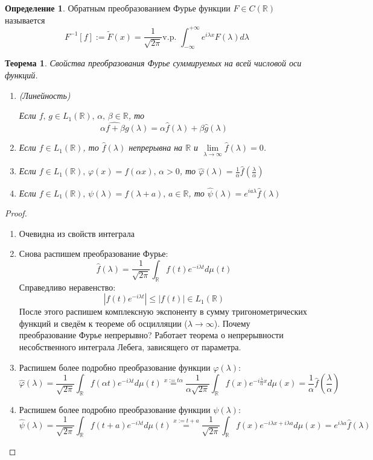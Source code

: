 \documentclass[a4paper,12pt]{article}
\renewcommand{\phi}{\ensuremath{\varphi}}
\renewcommand{\leq}{\ensuremath{\leqslant}}
\theoremstyle{plain}
\newtheorem{theorem}{Теорема}[section]
\theoremstyle{definition}
\newtheorem{definition}{Определение}[section]
\theoremstyle{remark}
\begin{document}
\begin{definition}
	Обратным преобразованием Фурье функции $F \in C(\mathbb{R})$ называется
	\[F^{-1}[f] := \tilde{F}(x) = \frac{1}{\sqrt{2\pi}} \text{v.p. }\int_{-\infty}^{+\infty}e^{i\lambda x}F(\lambda)d\lambda\]
\end{definition}

\begin{theorem}
	Свойства преобразования Фурье суммируемых на всей числовой оси функций.

	\begin{enumerate}
		\item (Линейность)

		      Если $f,\,g \in L_1(\mathbb{R}),\, \alpha,\, \beta \in \mathbb{R}$, то
		      \[\widehat{\alpha f + \beta g}(\lambda) = \alpha\hat{f}(\lambda) + \beta\hat{g}(\lambda)\]
		\item Если $f \in L_1(\mathbb{R})$, то $\hat{f}(\lambda)$ непрерывна на $\mathbb{R}$ и $\lim\limits_{\lambda \to \infty}\hat{f}(\lambda) = 0$.
		\item Если $f \in L_1(\mathbb{R}),\, \phi(x) = f(\alpha x),\, \alpha > 0$, то $\hat{\phi}(\lambda) = \frac{1}{\alpha}\hat{f}(\frac{\lambda}{\alpha})$
		\item Если $f \in L_1(\mathbb{R}),\, \psi(\lambda) = f(\lambda + a),\, a \in \mathbb{R}$, то $\hat{\psi}(\lambda) = e^{ia\lambda}\hat{f}(\lambda)$
	\end{enumerate}
\end{theorem}
\begin{proof}
	\begin{enumerate}
		\item Очевидна из свойств интеграла
		\item Снова распишем преобразование Фурье:
		      \[\hat{f}(\lambda) = \frac{1}{\sqrt{2\pi}}\int_\mathbb{R} f(t)e^{-i\lambda t}d\mu(t)\]
		      Справедливо неравенство:
		      \[|f(t)e^{-i\lambda t}| \leq |f(t)| \in L_1(\mathbb{R})\]
		      После этого распишем комплексную экспоненту в сумму тригонометрических функций и сведём к теореме об осцилляции ($\lambda \to \infty$). Почему преобразование Фурье непрерывно? Работает теорема о непрерывности несобственного интеграла Лебега, зависящего от параметра.
		\item Распишем более подробно преобразование функции $\phi(\lambda)$:
		      \[\hat{\phi}(\lambda) = \frac{1}{\sqrt{2\pi}}\int_\mathbb{R} f(\alpha t)e^{-i\lambda t}d\mu(t) \stackrel{x := t\alpha}{=} \frac{1}{\alpha\sqrt{2\pi}}\int_\mathbb{R}f(x)e^{-i\frac{\lambda}{\alpha}x}d\mu(x) = \frac{1}{\alpha}\hat{f}\left(\frac{\lambda}{\alpha}\right)\]
		\item Распишем более подробно преобразование функции $\psi(\lambda)$:
		      \[\hat{\psi}(\lambda) = \frac{1}{\sqrt{2\pi}}\int_\mathbb{R} f(t + a)e^{-i\lambda t}d\mu(t) \stackrel{x := t + a}{=} \frac{1}{\sqrt{2\pi}}\int_\mathbb{R}f(x)e^{-i\lambda x + i\lambda a}d\mu(x) = e^{i\lambda a}\hat{f}(\lambda)\]
	\end{enumerate}
\end{proof}
\end{document}
